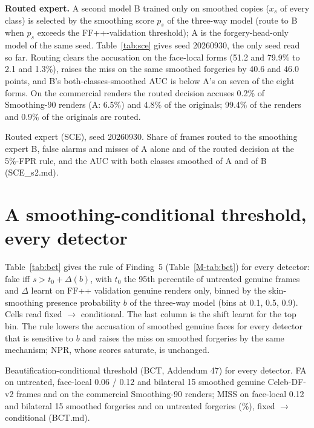 \documentclass[10pt]{article}
\begin{document}
\textbf{Routed expert.} A second model B trained only on smoothed copies ($x_s$ of every class) is selected by the smoothing
score $p_s$ of the three-way model (route to B when $p_s$ exceeds the FF++-validation threshold); A is the forgery-head-only
model of the same seed. Table~\ref{tab:sce} gives seed 20260930, the only seed read so far. Routing clears the accusation on
the face-local forms (51.2 and 79.9\% to 2.1 and 1.3\%), raises the miss on the same smoothed forgeries by 40.6 and 46.0
points, and B's both-classes-smoothed AUC is below A's on seven of the eight forms. On the commercial renders the routed
decision accuses 0.2\% of Smoothing-90 renders (A: 6.5\%) and 4.8\% of the originals; 99.4\% of the renders and 0.9\% of the
originals are routed.
\begin{table}[H]
\centering
\caption{Routed expert (SCE), seed 20260930. Share of frames routed to the smoothing expert B, false alarms and misses of A
alone and of the routed decision at the 5\%-FPR rule, and the AUC with both classes smoothed of A and of B (SCE\_s2.md).}
\label{tab:sce}
\scriptsize
\begin{adjustbox}{max width=\linewidth}\end{adjustbox}
\end{table}

\section{A smoothing-conditional threshold, every detector}
\label{sec:bct}
Table~\ref{tab:bct} gives the rule of Finding~5 (Table~\ref{M-tab:bct}) for every detector: fake iff $s>t_0+\Delta(b)$, with
$t_0$ the 95th percentile of untreated genuine frames and $\Delta$ learnt on FF++ validation genuine renders only, binned by the
skin-smoothing presence probability $b$ of the three-way model (bins at 0.1, 0.5, 0.9). Cells read fixed $\rightarrow$
conditional. The last column is the shift learnt for the top bin. The rule lowers the accusation of smoothed genuine faces for
every detector that is sensitive to $b$ and raises the miss on smoothed forgeries by the same mechanism; NPR, whose scores
saturate, is unchanged.
\begin{table}[H]
\centering
\caption{Beautification-conditional threshold (BCT, Addendum 47) for every detector. FA on untreated, face-local 0.06 / 0.12
and bilateral 15 smoothed genuine Celeb-DF-v2 frames and on the commercial Smoothing-90 renders; MISS on face-local 0.12 and
bilateral 15 smoothed forgeries and on untreated forgeries (\%), fixed $\rightarrow$ conditional (BCT.md).}
\label{tab:bct}
\scriptsize
\begin{adjustbox}{max width=\linewidth}\end{adjustbox}
\end{table}
\end{document}
